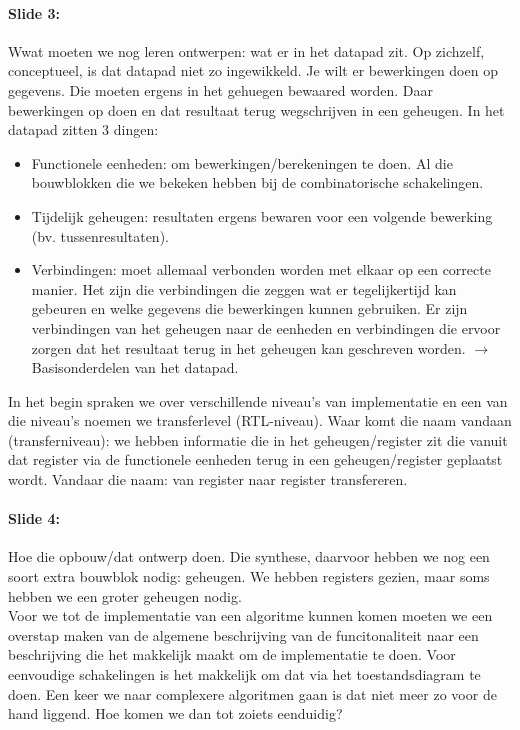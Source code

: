 \documentclass[10pt,a4paper]{book}
\begin{document}
\paragraph{Slide 3:} Wwat moeten we nog leren ontwerpen: wat er in het datapad zit. Op zichzelf, conceptueel, is dat datapad niet zo ingewikkeld. Je wilt er bewerkingen doen op gegevens. Die moeten ergens in het gehuegen bewaared worden. Daar bewerkingen op doen en dat resultaat terug wegschrijven in een geheugen. In het datapad zitten 3 dingen:
\begin{itemize}
\item Functionele eenheden: om bewerkingen/berekeningen te doen. Al die bouwblokken die we bekeken hebben bij de combinatorische schakelingen.	
\item Tijdelijk geheugen: resultaten ergens bewaren voor een volgende bewerking (bv. tussenresultaten).	
\item Verbindingen: moet allemaal verbonden worden met elkaar op een correcte manier. Het zijn die verbindingen die zeggen wat er tegelijkertijd kan gebeuren en welke gegevens die bewerkingen kunnen gebruiken. Er zijn verbindingen van het geheugen naar de eenheden en verbindingen die ervoor zorgen dat het resultaat terug in het geheugen kan geschreven worden. $\rightarrow$ Basisonderdelen van het datapad.
\end{itemize}	
In het begin spraken we over verschillende niveau's van implementatie en een van die niveau's noemen we transferlevel (RTL-niveau). Waar komt die naam vandaan (transferniveau): we hebben informatie die in het geheugen/register zit die vanuit dat register via de functionele eenheden terug in een geheugen/register geplaatst wordt. Vandaar die naam: van register naar register transfereren.

\paragraph{Slide 4:} Hoe die opbouw/dat ontwerp doen. Die synthese, daarvoor hebben we nog een soort extra bouwblok nodig: geheugen. We hebben registers gezien, maar soms hebben we een groter geheugen nodig.\\
Voor we tot de implementatie van een algoritme kunnen komen moeten we een overstap maken van de algemene beschrijving van de funcitonaliteit naar een beschrijving die het makkelijk maakt om de implementatie te doen. Voor eenvoudige schakelingen is het makkelijk om dat via het toestandsdiagram te doen. Een keer we naar complexere algoritmen gaan is dat niet meer zo voor de hand liggend. Hoe komen we dan tot zoiets eenduidig?
\end{document}
